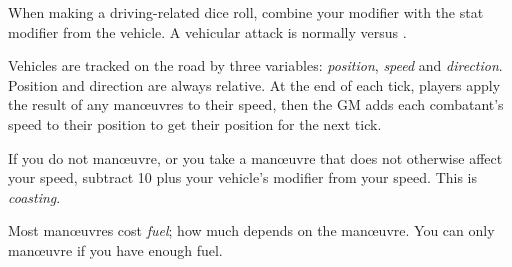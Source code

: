 
When making a driving-related dice roll, combine your  modifier with the stat modifier from the vehicle. A vehicular attack is normally  versus .

Vehicles are tracked on the road by three variables: \emph{position}, \emph{speed} and \emph{direction}. Position and direction are always relative. At the end of each tick, players apply the result of any man\oe{}uvres to their speed, then the GM adds each combatant's speed to their position to get their position for the next tick.

If you do not man\oe{}uvre, or you take a man\oe{}uvre that does not otherwise affect your speed, subtract 10 plus your vehicle's  modifier from your speed. This is \emph{coasting}.

Most man\oe{}uvres cost \emph{fuel}; how much depends on the man\oe{}uvre. You can only man\oe{}uvre if you have enough fuel.
